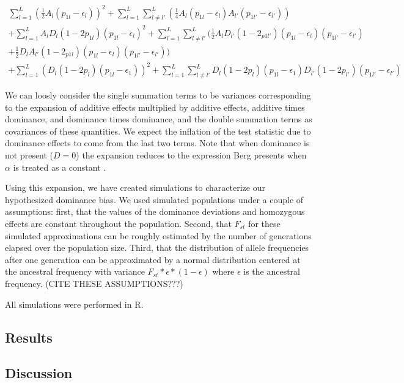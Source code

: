 \documentclass[a4paper,11pt]{article}
\begin{document}
\begin{equation}
  \begin{split}
  \sum^L_{l=1}( \frac{1}{2}A_l(p_{1l}-\epsilon_l))^2+\sum^L_{l=1}\sum^L_{
    l \neq l'}(\frac{1}{4}A_l(p_{1l}-\epsilon_{l})A_{l'}(p_{1l'}-\epsilon_{l'}))
  \\
  +\sum^L_{l=1}A_lD_l(1-2p_{1l})(p_{1l}-\epsilon_l)^2 +
  \sum^L_{l=1}\sum^L_{l \neq
    l'}(\frac{1}{2}A_lD_{l'}(1-2_{p1l'})(p_{1l}-\epsilon_l)(p_{1l'}-\epsilon_{l'}) \\
  + \frac{1}{2}D_lA_{l'}(1-2_{p1l})(p_{1l}-\epsilon_l)(p_{1l'}-\epsilon_{l'})) \\
   + \sum^L_{l=1} (D_l(1-2p_l)(p_{1l}-\epsilon_{1}))^2
   + \sum^L_{l=1}\sum^L_{l \neq
     l'}D_{l}(1-2p_{l})(p_{1l}-\epsilon_{1})D_{l'}(1-2p_{l'})(p_{1l'}-\epsilon_{l'}) \label{expansion}
  \end{split}
\end{equation}

We can loosly consider the single summation terms to be variances
corresponding to the expansion of additive effects multiplied by
additive effects, additive times dominance, and dominance times
dominance, and the double summation terms as covariances of these
quantities. We expect the inflation of the test statistic due to
dominance effects to come from the last two terms. Note that when
dominance is not present ($D=0$) the expansion reduces to the
expression Berg presents when $\alpha$ is treated as a constant
\cite{berg}.

Using this expansion, we have created simulations to characterize our
hypothesized dominance bias. We used simulated populations
under a couple of assumptions: first, that the values of the dominance
deviations and homozygous effects are constant throughout the
population. Second, that $F_{st}$ for these simulated approximations
can be roughly estimated by the number of generations elapsed over the
population size. Third, that the distribution of allele frequencies after
one generation can be approximated by a normal distribution centered
at the ancestral frequency with variance
$F_{st}*\epsilon*(1-\epsilon)$ where $\epsilon$ is the ancestral
frequency. (CITE THESE ASSUMPTIONS???)

All simulations were performed in R. 

\subsection*{Results}

\subsection*{Discussion}




\end{document}
